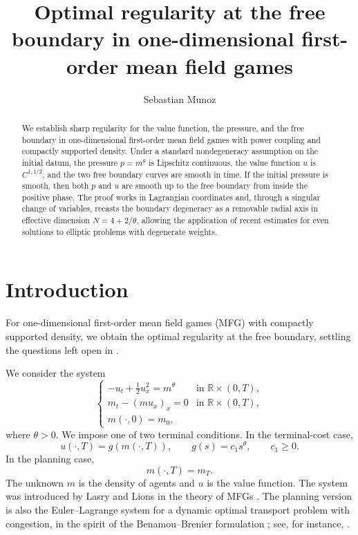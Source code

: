 \documentclass[11pt]{amsart}
\title[Optimal regularity at the free boundary in mean field games]{Optimal regularity at the free boundary in one-dimensional first-order mean field games}
\author{Sebastian Munoz}
\date{}
\newcommand{\R}{\mathbb R}
\begin{document}
\begin{abstract}
We establish sharp regularity for the value function, the pressure, and the
free boundary in one-dimensional first-order mean field games with power
coupling and compactly supported density. Under a standard nondegeneracy assumption on the initial datum, the pressure
\(p=m^\theta\) is Lipschitz continuous, the value function \(u\) is
\(C^{1,1/2}\), and the two free boundary curves are smooth in time. If the
initial pressure is smooth, then both
\(p\) and \(u\) are smooth up to the free boundary from inside the positive
phase. The proof works in Lagrangian coordinates and, through a singular change of
variables, recasts the boundary degeneracy as a removable radial axis in effective dimension \(N=4+2/\theta\), allowing the application of recent estimates for even solutions to elliptic problems with degenerate weights.
\end{abstract}

\maketitle

\section{Introduction}


For one-dimensional first-order mean field games (MFG) with compactly supported density, we obtain the optimal regularity at the free boundary, settling the questions left open in \cite{CMP}.

We consider the system
\begin{equation}
\label{eq:mfg-system}
\begin{cases}
        -u_t+\frac12 u_x^2=m^\theta
                &\text{in }\R\times(0,T),\\
        m_t-(mu_x)_x=0
                &\text{in }\R\times(0,T),\\
        m(\cdot,0)=m_0,
\end{cases}
\end{equation}
where \(\theta>0\). We impose one of two terminal conditions. In the
terminal-cost case,
\begin{equation}
\label{ass:mfg-terminal}
        u(\cdot,T)=g(m(\cdot,T)),\qquad
        g(s)=c_1s^\theta,\qquad c_1\ge0 .
\end{equation}
In the planning case,
\begin{equation}
\label{ass:planning-terminal}
        m(\cdot,T)=m_T .
\end{equation}
The unknown \(m\) is the density of agents and \(u\) is the value function.
The system was introduced by Lasry and Lions in the theory of MFGs
\cite{LL06,LL07}. The planning version is also the Euler--Lagrange system for
a dynamic optimal transport problem with congestion, in the spirit of the
Benamou--Brenier formulation \cite{BB00}; see, for instance,
\cite{GMS19,LS18,OPS19}.
\end{document}
